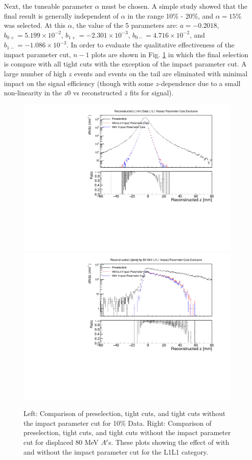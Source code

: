 Next, the tuneable parameter $\alpha$ must be chosen. A simple study showed that the final result is generally independent of $\alpha$ in the range 10\% - 20\%, and $\alpha=15\%$ was selected. At this $\alpha$, the value of the 5 parameters are: $a=-0.2018$, $b_{0+}=5.199 \times 10^{-2}$,  $b_{1+}=-2.301 \times 10^{-3}$,  $b_{0-}=4.716 \times 10^{-2}$,  and $b_{1-}=-1.086 \times 10^{-3}$. In order to evaluate the qualitative effectiveness of the impact parameter cut, $n-1$ plots are shown in Fig. \ref{fig:ip_L1L1} in which the final selection is compare with all tight cuts with the exception of the impact parameter cut. A large number of high $z$ events and events on the tail are eliminated with minimal impact on the signal efficiency (though with some $z$-dependence due to a small non-linearity in the $z0$ vs reconstructed $z$ fits for signal).

\begin{figure}[!ht] 
    \centering
    \includegraphics[width=.45\textwidth]{figs/selection/ip_n_1_z.pdf}
    \includegraphics[width=.45\textwidth]{figs/selection/ap_80MeV_ip_n_1_z.pdf}
    \caption{
    	Left: Comparison of preselection, tight cuts, and tight cuts without the impact parameter cut for 10\% Data. Right: Comparison of preselection, tight cuts, and tight cuts without the impact parameter cut for displaced 80 MeV $A^\prime$s. These plots showing the effect of with and without the impact parameter cut for the L1L1 category.
    }
    \label{fig:ip_L1L1}
\end{figure} 

